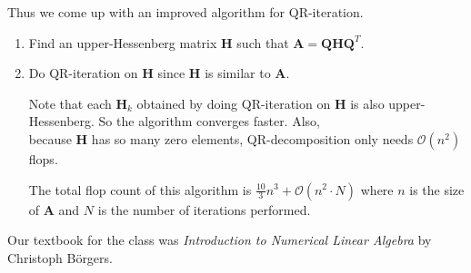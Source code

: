 \documentclass{book}
\newcommand{\teachComment}{
   \color{Orange}%
   \fontsize{12}{14}\selectfont%
}
\newcommand{\exOne}{%
   \color{Purple}%
   \fontsize{14}{16}\selectfont%
}
\newenvironment{myIndent}{%
   \begin{adjustwidth}{2.5em}{0em}%
}{%
   \end{adjustwidth}%
}
\newenvironment{myTindent}{%
   \begin{adjustwidth}{7.5em}{0em}%
}{%
   \end{adjustwidth}%
}
\newcommand{\retTwo}{\hfill\bigbreak}
\newcommand{\mMat}[1]{\mathbf{#1}}
\begin{document}
{\begin{myIndent}
      Thus we come up with an improved algorithm for QR-iteration.
      \begin{enumerate}
         \item Find an upper-Hessenberg matrix $\mMat{H}$ such that $\mMat{A} = \mMat{QHQ}^T$.
         \item Do QR-iteration on $\mMat{H}$ since $\mMat{H}$ is similar to $\mMat{A}$.\retTwo
         
         {\begin{myTindent} \teachComment
            Note that each $\mMat{H}_k$ obtained by doing QR-iteration on $\mMat{H}$ is also upper-Hessenberg. So the algorithm converges faster. Also,\\ because $\mMat{H}$ has so many zero elements, QR-decomposition only needs $\mathcal{O}(n^2)$ flops. \retTwo

            The total flop count of this algorithm is $\frac{10}{3}n^3 + \mathcal{O}(n^2\cdot N)$ where $n$ is the size of $\mMat{A}$ and $N$ is the number of iterations performed.
         \end{myTindent}}
      \end{enumerate}
   \end{myIndent}}
   \retTwo
   \retTwo
   \retTwo
   \retTwo
   \retTwo
   \retTwo
   \retTwo
   \retTwo
   \retTwo
   \retTwo
   \retTwo
   \retTwo
   \exOne
   Our textbook for the class was \textit{Introduction to Numerical Linear Algebra} by Christoph Börgers.
\end{document}
